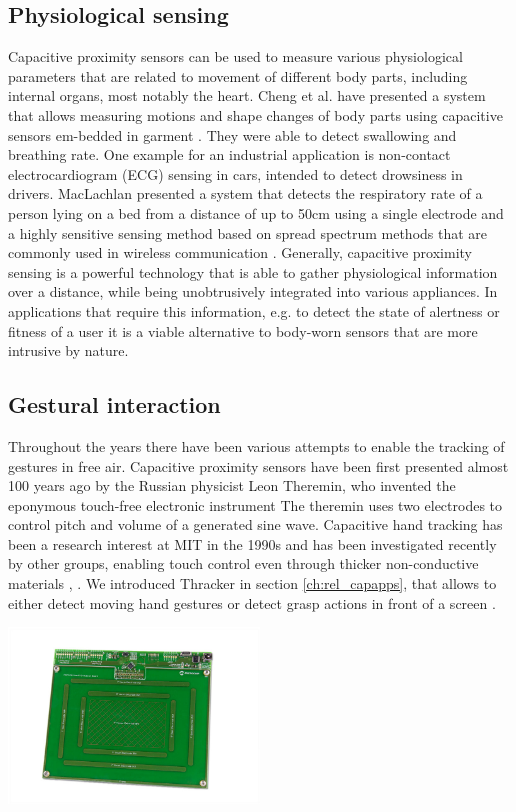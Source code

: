 \subsection{Physiological sensing}
Capacitive proximity sensors can be used to measure various physiological parameters that are related to movement of different body parts, including internal organs, most notably the heart. Cheng et al. have presented a system that allows measuring motions and shape changes of body parts using capacitive sensors em-bedded in garment \cite{cheng2010active}. They were able to detect swallowing and breathing rate. One example for an industrial application is non-contact electrocardiogram (ECG) sensing in cars, intended to detect drowsiness in drivers. MacLachlan presented a system that detects the respiratory rate of a person lying on a bed from a distance of up to 50cm using a single electrode and a highly sensitive sensing method based on spread spectrum methods that are commonly used in wireless communication \cite{MacLachlan2004}.
Generally, capacitive proximity sensing is a powerful technology that is able to gather physiological information over a distance, while being unobtrusively integrated into various appliances. In applications that require this information, e.g. to detect the state of alertness or fitness of a user it is a viable alternative to body-worn sensors that are more intrusive by nature. \subsection{Gestural interaction}
Throughout the years there have been various attempts to enable the tracking of gestures in free air. Capacitive proximity sensors have been first presented almost 100 years ago by the Russian physicist Leon Theremin, who invented the eponymous touch-free electronic instrument \cite{Glinsky2000} The theremin uses two electrodes to control pitch and volume of a generated sine wave. Capacitive hand tracking has been a research interest at MIT in the 1990s \cite{smith1999thesis} and has been investigated recently by other groups, enabling touch control even through thicker non-conductive materials \cite{Wimmer2007a}, \cite{Braun2009HumanBodyField}. 
We introduced Thracker in section \ref{ch:rel_capapps}, that allows to either detect moving hand gestures or detect grasp actions in front of a screen  \cite{Wimmer2006}.

\begin{minipage}{\linewidth}
\centering
\includegraphics[width=0.5\textwidth]{images/gestic}
\label{fig:prot_rel_gestic}
\end{minipage}

